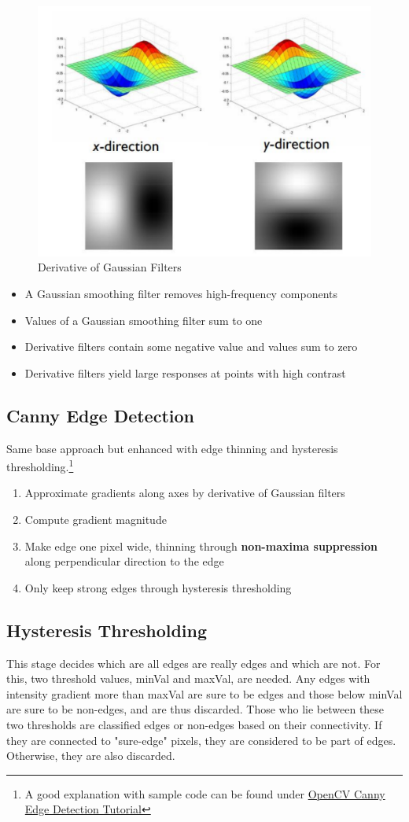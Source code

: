 \documentclass[x11names,11pt,a4paper]{article}
\theoremstyle{definition}
\begin{document}
\begin{figure}[H]
	\centering
	\includegraphics[width=0.6\linewidth]{img/derivative_gaussian_filter2}
	\caption{Derivative of Gaussian Filters}
	\label{fig:derivativegaussianfilter2}
\end{figure}

\begin{itemize}
	\item A Gaussian smoothing filter removes high-frequency components
	\item Values of a Gaussian smoothing filter sum to one
	\item Derivative filters contain some negative value and values sum to zero
	\item Derivative filters yield large responses at points with high contrast
\end{itemize}

\subsection{Canny Edge Detection}
Same base approach but enhanced with edge thinning and hysteresis thresholding.\footnote{A good explanation with sample code can be found under \href{https://docs.opencv.org/4.3.0/da/d22/tutorial_py_canny.html}{OpenCV Canny Edge Detection Tutorial}}
\begin{enumerate}
	\item Approximate gradients along axes by derivative of Gaussian filters
	\item Compute gradient magnitude
	\item Make edge one pixel wide, thinning through \textbf{non-maxima suppression} along perpendicular direction to the edge
	\item Only keep strong edges through hysteresis thresholding 
\end{enumerate}

\subsection{Hysteresis Thresholding}
This stage decides which are all edges are really edges and which are not. For this, two threshold values, minVal and maxVal, are needed. Any edges with intensity gradient more than maxVal are sure to be edges and those below minVal are sure to be non-edges, and are thus discarded. Those who lie between these two thresholds are classified edges or non-edges based on their connectivity. If they are connected to "sure-edge" pixels, they are considered to be part of edges. Otherwise, they are also discarded.
	
\end{document}
